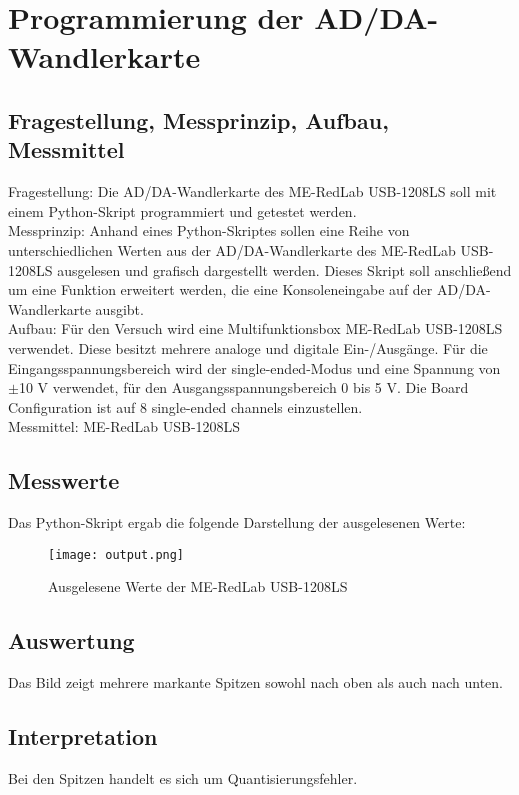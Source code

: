 %
%
\chapter{Programmierung der AD/DA-Wandlerkarte}
\label{chap:VERSUCH_1}

\section{Fragestellung, Messprinzip, Aufbau, Messmittel}
\label{chap:VERSUCH_1_FRAGESTELLUNG}
Fragestellung: Die AD/DA-Wandlerkarte des ME-RedLab USB-1208LS soll mit einem Python-Skript programmiert und getestet werden.\\
Messprinzip: Anhand eines Python-Skriptes sollen eine Reihe von unterschiedlichen Werten aus der AD/DA-Wandlerkarte des ME-RedLab USB-1208LS ausgelesen und grafisch dargestellt werden. Dieses Skript soll anschließend um eine Funktion erweitert werden, die eine Konsoleneingabe auf der AD/DA-Wandlerkarte ausgibt.\\
Aufbau: Für den Versuch wird eine Multifunktionsbox ME-RedLab USB-1208LS verwendet. Diese besitzt mehrere analoge und digitale Ein-/Ausgänge. Für die Eingangsspannungsbereich wird der single-ended-Modus und eine Spannung von $\pm$10 V verwendet, für den Ausgangsspannungsbereich 0 bis 5 V. Die Board Configuration ist auf 8 single-ended channels einzustellen.\\
Messmittel: ME-RedLab USB-1208LS

\section{Messwerte}
\label{chap:VERSUCH_1_MESSWERTE}
Das Python-Skript ergab die folgende Darstellung der ausgelesenen Werte:
\begin{figure}[H]
\begin{center}
\texttt{[image: output.png]}
\caption{Ausgelesene Werte der ME-RedLab USB-1208LS}
\end{center}
\end{figure}

\section{Auswertung}
\label{chap:VERSUCH_1_AUSWERTUNG}
Das Bild zeigt mehrere markante Spitzen sowohl nach oben als auch nach unten.

\section{Interpretation}
\label{chap:VERSUCH_1_INTERPRETATION}
Bei den Spitzen handelt es sich um Quantisierungsfehler.